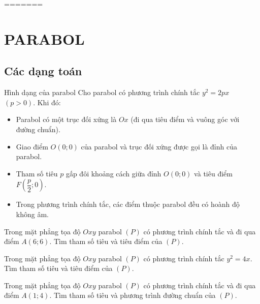 =======
\section{PARABOL}
\subsection{Các dạng toán}
\begin{dang}{Hình dạng của parabol}
	Cho parabol có phương trình chính tắc $y^2=2px$ $(p>0)$. Khi đó:
	\begin{itemize}
		\item Parabol có một trục đối xứng là $Ox$ (đi qua tiêu điểm và vuông góc với đường chuẩn).
		\item Giao điểm $O(0;0)$ của parabol và trục đối xứng được gọi là đỉnh của parabol.
		\item Tham số tiêu $p$ gấp đôi khoảng cách giữa đỉnh $O(0;0)$ và tiêu điểm $F\left(\dfrac{p}{2};0\right)$.
		\item Trong phương trình chính tắc, các điểm thuộc parabol đều có hoành độ không âm.
	\end{itemize}
\end{dang}
\begin{vd}
	Trong mặt phẳng tọa độ $Oxy$ parabol $(P)$ có phương trình chính tắc và đi qua điểm $A(6;6)$. Tìm tham số tiêu và tiêu điểm của $(P)$.
\end{vd}
\begin{vd}
	Trong mặt phẳng tọa độ $Oxy$ parabol $(P)$ có phương trình chính tắc $y^2=4x$. Tìm tham số tiêu và tiêu điểm của $(P)$.
\end{vd}
\begin{vd}
	Trong mặt phẳng tọa độ $Oxy$ parabol $(P)$ có phương trình chính tắc và đi qua điểm $A(1;4)$. Tìm tham số tiêu và phương trình đường chuẩn của $(P)$.
\end{vd}
